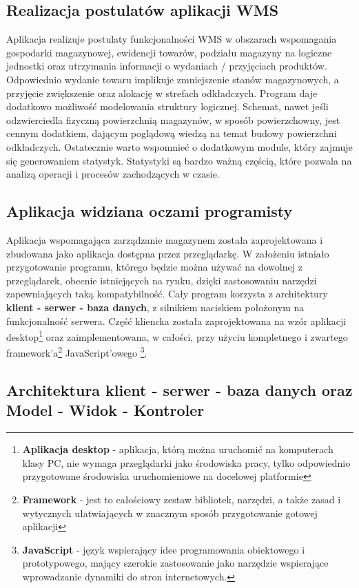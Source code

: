 	\subsection{Realizacja postulatów aplikacji WMS}
		Aplikacja realizuje postulaty funkcjonalności WMS w obszarach wspomagania gospodarki magazynowej,
		ewidencji towarów, podziału magazyny na logiczne jednostki oraz utrzymania informacji
		o wydaniach / przyjęciach produktów. Odpowiednio wydanie towaru implikuje zmniejszenie stanów
		magazynowych, a przyjęcie zwiększenie oraz alokację w strefach odkładczych. 
		Program daje dodatkowo możliwość modelowania struktury logicznej. Schemat, nawet jeśli odzwierciedla
		fizyczną powierzchnią magazynów, w sposób powierzchowny, jest cennym dodatkiem, dającym
		poglądową wiedzą na temat budowy powierzchni odkładczych. 
		Ostatecznie warto wspomnieć o dodatkowym module, który zajmuje się generowaniem statystyk.
		Statystyki są bardzo ważną częścią, które pozwala na analizą operacji i procesów zachodzących
		w czasie.
	\subsection{Aplikacja widziana oczami programisty}
		Aplikacja wspomagająca zarządzanie magazynem została zaprojektowana i zbudowana jako aplikacja
		dostępna przez przeglądarkę. W założeniu istniało przygotowanie programu, którego będzie można
		używać na dowolnej z przeglądarek, obecnie istniejących na rynku, dzięki zastosowaniu
		narzędzi zapewniających taką kompatybilność. Cały program korzysta z architektury
		\textbf{klient - serwer - baza danych}, z silnikiem naciskiem położonym na funkcjonalność
		serwera. Część kliencka została zaprojektowana na wzór aplikacji desktop\footnote{
			\textbf{Aplikacja desktop} - aplikacja, którą można uruchomić na komputerach klasy PC,
			nie wymaga przeglądarki jako środowiska pracy, tylko odpowiednio przygotowane
			środowiska uruchomieniowe na docelowej platformie		
		} oraz zaimplementowana, w całości, przy użyciu kompletnego i zwartego framework'a\footnote{
			\textbf{Framework} - jest to całościowy zestaw bibliotek, narzędzi, a także zasad i wytycznych
			ułatwiających w znacznym sposób przygotowanie gotowej aplikacji		
		} JavaScript'owego \footnote{
			\textbf{JavaScript} - język wspierający idee programowania obiektowego i prototypowego, mający
			szerokie zastosowanie jako narzędzie wspierające wprowadzanie dynamiki do stron
			internetowych. 		
		}.
	\subsection{Architektura klient - serwer - baza danych oraz Model - Widok - Kontroler}
